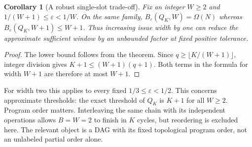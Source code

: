 \documentclass[11pt]{article}
\newtheorem{corollary}[theorem]{Corollary}
\begin{document}
\begin{corollary}[A robust single-slot trade-off]
Fix an integer $W\ge2$ and $1/(W+1)\le\varepsilon<1/W$. On the same
family, $B_\varepsilon(Q_K,W)=\Omega(N)$ whereas
$B_\varepsilon(Q_K,W+1)\le W+1$. Thus increasing issue width by one can
reduce the approximate sufficient window by an unbounded factor at fixed
positive tolerance.
\end{corollary}
\begin{proof}
The lower bound follows from the theorem. Since
$q\ge\lfloor K/(W+1)\rfloor$, integer division gives
$K+1\le(W+1)(q+1)$. Both terms in the formula for width $W+1$ are
therefore at most $W+1$.
\end{proof}
For width two this applies to every fixed $1/3\le\varepsilon<1/2$.
This concerns approximate thresholds: the exact threshold of $Q_K$ is
$K+1$ for all $W\ge2$. Program order matters. Interleaving the same chain
with its independent operations allows $B=W=2$ to finish in $K$ cycles,
but reordering is excluded here. The relevant object is a DAG with its fixed
topological program order, not an unlabeled partial order alone.
\end{document}
